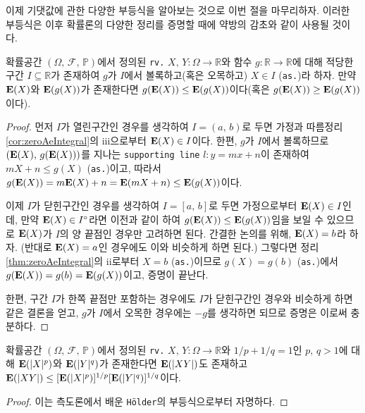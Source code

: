 이제 기댓값에 관한 다양한 부등식을 알아보는 것으로 이번 절을 마무리하자. 이러한 부등식은 이후 확률론의 다양한 정리를 증명할 때에 약방의 감초와 같이 사용될 것이다.

\begin{theorem}
    확률공간 $(\Omega,\,\mathcal{F},\,\mathbb{P})$에서 정의된 \texttt{rv.} $X,\,Y:\Omega\to\mathbb{R}$와 함수 $g:\mathbb{R}\to\mathbb{R}$에 대해 적당한 구간 $I\subseteq\mathbb{R}$가 존재하여 $g$가 $I$에서 볼록하고(혹은 오목하고) $X\in I$ (\texttt{as.})라 하자. 만약 $\mathbf{E}(X)$와 $\mathbf{E}(g(X))$가 존재한다면 $g(\mathbf{E}(X))\leq\mathbf{E}(g(X))$이다(혹은 $g(\mathbf{E}(X))\geq\mathbf{E}(g(X))$이다).
\end{theorem}

\begin{proof}
    먼저 $I$가 열린구간인 경우를 생각하여 $I=(a,\,b)$로 두면 가정과 따름정리 \ref{cor:zeroAeIntegral}의 iii으로부터 $\mathbf{E}(X)\in I$이다. 한편, $g$가 $I$에서 볼록하므로 $(\mathbf{E}(X),\,g(\mathbf{E}(X)))$를 지나는 \texttt{supporting line} $l:y=mx+n$이 존재하여 $mX+n\leq g(X)$ (\texttt{as.})이고, 따라서 $g(\mathbf{E}(X))=m\mathbf{E}(X)+n=\mathbf{E}(mX+n)\leq\mathbf{E}(g(X))$이다.

    이제 $I$가 닫힌구간인 경우를 생각하여 $I=[a,\,b]$로 두면 가정으로부터 $\mathbf{E}(X)\in I$인데, 만약 $\mathbf{E}(X)\in I^\circ$라면 이전과 같이 하여 $g(\mathbf{E}(X))\leq\mathbf{E}(g(X))$임을 보일 수 있으므로 $\mathbf{E}(X)$가 $I$의 양 끝점인 경우만 고려하면 된다. 간결한 논의를 위해, $\mathbf{E}(X)=b$라 하자. (반대로 $\mathbf{E}(X)=a$인 경우에도 이와 비슷하게 하면 된다.) 그렇다면 정리 \ref{thm:zeroAeIntegral}의 ii로부터 $X=b$ (\texttt{as.})이므로 $g(X)=g(b)$ (\texttt{as.})에서 $g(\mathbf{E}(X))=g(b)=\mathbf{E}(g(X))$이고, 증명이 끝난다.

    한편, 구간 $I$가 한쪽 끝점만 포함하는 경우에도 $I$가 닫힌구간인 경우와 비슷하게 하면 같은 결론을 얻고, $g$가 $I$에서 오목한 경우에는 $-g$를 생각하면 되므로 증명은 이로써 충분하다.
\end{proof}

\begin{theorem}
    확률공간 $(\Omega,\,\mathcal{F},\,\mathbb{P})$에서 정의된 \texttt{rv.} $X,\,Y:\Omega\to\mathbb{R}$와 $1/p+1/q=1$인 $p,\,q>1$에 대해 $\mathbf{E}(|X|^p)$와 $\mathbf{E}(|Y|^q)$가 존재한다면 $\mathbf{E}(|XY|)$도 존재하고 $\mathbf{E}(|XY|)\leq[\mathbf{E}(|X|^p)]^{1/p}[\mathbf{E}(|Y|^q)]^{1/q}$이다.
\end{theorem}

\begin{proof}
    이는 측도론에서 배운 \texttt{H\"older}의 부등식으로부터 자명하다.
\end{proof}

